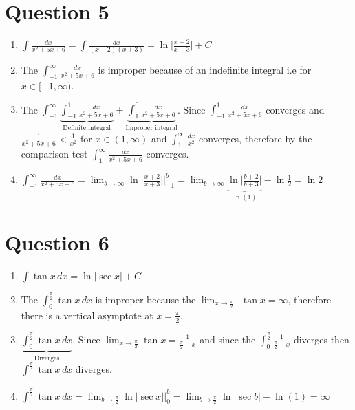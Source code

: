 \documentclass[12pt]{article}
\begin{document}
    \section*{Question 5}
		\begin{enumerate}
			\item $\int \frac{dx}{x^2+5x+6} =\int \frac{dx}{(x+2)(x+3)} =\ln\bigg|\frac{x+2}{x+3}\bigg| + C$
			\item The $\int_{-1}^{\infty} \frac{dx}{x^2+5x+6}$ is improper because of an indefinite integral i.e for $x \in[-1, \infty)$.
				\item The $\int_{-1}^{\infty}\underbrace{\int_{-1}^{1} \frac{dx}{x^2+5x+6}}_{\text{Definite integral}} + \underbrace{\int_{1}^{0} \frac{dx}{x^2+5x+6}}_{\text{Improper integral}}$. Since $\int_{-1}^{1} \frac{dx}{x^2+5x+6}$ converges and $\frac{1}{x^2+5x+6}<\frac{1}{x^2}$ for $x\in(1,\infty)$ and $\int_{1}^{\infty} \frac{dx}{x^2}$ converges, therefore by the comparison test $\int_{1}^{\infty} \frac{dx}{x^2+5x+6}$ converges.
				\item $\int_{-1}^{\infty} \frac{dx}{x^2+5x+6} = \lim_{b\to\infty} \ln\bigg|\frac{x+2}{x+3}\bigg|\biggr\rvert_{-1}^{b} = \lim_{b\to\infty}\underbrace{\ln\bigg|\frac{b+2}{b+3}\bigg|}_{\ln (1)} - \ln \frac{1}{2}= \ln 2$
				\end{enumerate}
    \section*{Question 6}
				\begin{enumerate}
					\item $\int \tan x \, dx =\ln|\sec x| + C$
					\item The $\int_{0}^{\frac{\pi}{2}} \tan x \, dx$ is improper because the $\lim_{x\to\frac{\pi}{2}^-} \tan x = \infty$, therefore there is a vertical asymptote at $x = \frac{\pi}{2}$.
				\item $\underbrace{\int_{0}^{\frac{\pi}{2}} \tan x \, dx}_{\text{Diverges}}$. Since $\lim_{x\to\frac{\pi}{2}} \tan x = \frac{1}{\frac{\pi}{2}-x}$ and since the $\int_{0}^{\frac{\pi}{2}} \frac{1}{\frac{\pi}{2}-x}$ diverges then  $\int_{0}^{\frac{\pi}{2}} \tan x \, dx$ diverges.  
                    \item $\int_{0}^{\frac{\pi}{2}} \tan x \, dx = \lim_{b\to \frac{\pi}{2}} \ln|\sec x| \biggr\rvert_{0}^{b} = \lim_{b\to \frac{\pi}{2}} \ln|\sec b| - \ln(1) = \infty $
				\end{enumerate}
\end{document}
